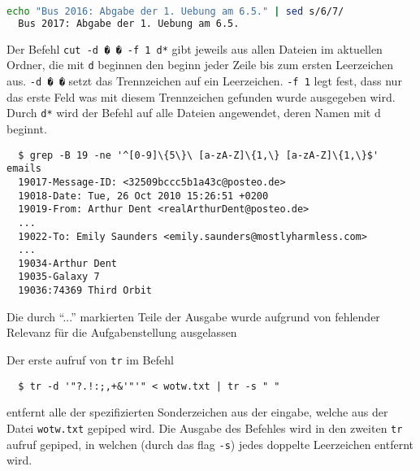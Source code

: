 \documentclass[a4paper,twoside,subproblemsty=arabic,subsubproblemsty=alph,listings,helvet]{homeworkassignment}
\begin{document}
\newsubproblem[2]
\newsubsubproblem
\begin{lstlisting}[language=bash]
   echo "Bus 2016: Abgabe der 1. Uebung am 6.5." | sed s/6/7/
  Bus 2017: Abgabe der 1. Uebung am 6.5.
\end{lstlisting}

\newsubsubproblem
Der Befehl \texttt{cut -d � � -f 1 d*} gibt jeweils aus allen
Dateien im aktuellen Ordner, die mit \texttt{d} beginnen den beginn
jeder Zeile bis zum ersten Leerzeichen aus. \texttt{-d � �} setzt das
Trennzeichen auf ein Leerzeichen. \texttt{-f 1} legt fest, dass nur
das erste Feld was mit diesem Trennzeichen gefunden wurde ausgegeben
wird. Durch \texttt{d*} wird der Befehl auf alle Dateien angewendet,
deren Namen mit d beginnt.

\newsubsubproblem
\begin{lstlisting}
  $ grep -B 19 -ne '^[0-9]\{5\}\ [a-zA-Z]\{1,\} [a-zA-Z]\{1,\}$' emails
  19017-Message-ID: <32509bccc5b1a43c@posteo.de>
  19018-Date: Tue, 26 Oct 2010 15:26:51 +0200
  19019-From: Arthur Dent <realArthurDent@posteo.de>
  ...
  19022-To: Emily Saunders <emily.saunders@mostlyharmless.com>
  ...
  19034-Arthur Dent
  19035-Galaxy 7
  19036:74369 Third Orbit
\end{lstlisting}
Die durch ``...'' markierten Teile der Ausgabe wurde aufgrund
von fehlender Relevanz f\"ur die Aufgabenstellung ausgelassen



\newsubproblem[3] %
\newsubsubproblem

Der erste aufruf von \texttt{tr} im Befehl
\begin{lstlisting}
  $ tr -d '"?.!:;,+&'"'" < wotw.txt | tr -s " "
\end{lstlisting}%
entfernt alle der spezifizierten Sonderzeichen aus der eingabe, welche
aus der Datei \texttt{wotw.txt} gepiped wird. Die Ausgabe des Befehles
wird in den zweiten \texttt{tr} aufruf gepiped, in welchen (durch das
flag \texttt{-s}) jedes doppelte Leerzeichen entfernt wird.
%
\end{document}
